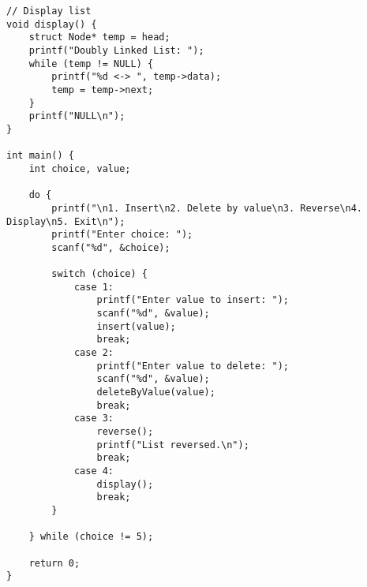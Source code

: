 \documentclass[12pt,a4paper]{article}
\begin{document}
\begin{lstlisting}
// Display list
void display() {
    struct Node* temp = head;
    printf("Doubly Linked List: ");
    while (temp != NULL) {
        printf("%d <-> ", temp->data);
        temp = temp->next;
    }
    printf("NULL\n");
}

int main() {
    int choice, value;

    do {
        printf("\n1. Insert\n2. Delete by value\n3. Reverse\n4. Display\n5. Exit\n");
        printf("Enter choice: ");
        scanf("%d", &choice);

        switch (choice) {
            case 1:
                printf("Enter value to insert: ");
                scanf("%d", &value);
                insert(value);
                break;
            case 2:
                printf("Enter value to delete: ");
                scanf("%d", &value);
                deleteByValue(value);
                break;
            case 3:
                reverse();
                printf("List reversed.\n");
                break;
            case 4:
                display();
                break;
        }

    } while (choice != 5);

    return 0;
}
\end{lstlisting}



\newpage
\end{document}
